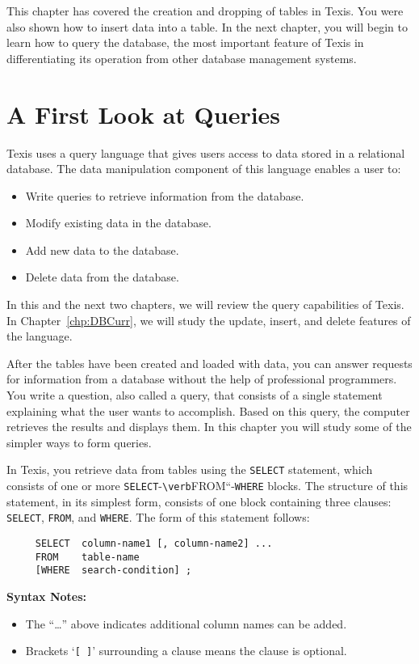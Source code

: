 This chapter has covered the creation and dropping of tables in Texis.
You were also shown how to insert data into a table.  In the next
chapter, you will begin to learn how to query the database, the most
important feature of Texis in differentiating its operation from other
database management systems.

\chapter{A First Look at Queries}{\label{chp:Quer}}

Texis uses a query language that gives users access to data stored in
a relational database.  The data manipulation component of this
language enables a user to:

\begin{itemize}
\item Write queries to retrieve information from the database.
\item Modify existing data in the database.
\item Add new data to the database.
\item Delete data from the database.
\end{itemize}

In this and the next two chapters, we will review the query
capabilities of Texis.  In Chapter~\ref{chp:DBCurr}, we will study the
update, insert, and delete features of the language.

After the tables have been created and loaded with data, you can
answer requests for information from a database without the help of
professional programmers.  You write a question, also called a query,
that consists of a single statement explaining what the user wants to
accomplish.  Based on this query, the computer retrieves the results
and displays them.  In this chapter you will study some of the simpler
ways to form queries.

In Texis, you retrieve data from tables using the \verb`SELECT` statement,
which consists of one or more \verb`SELECT`-\verb`\verb`FROM``-\verb`WHERE` blocks.  The structure
of this statement, in its simplest form, consists of one block
containing three clauses:  \verb`SELECT`, \verb`FROM`, and \verb`WHERE`.  The form of this
statement follows:
\begin{verbatim}
     SELECT  column-name1 [, column-name2] ...
     FROM    table-name
     [WHERE  search-condition] ;
\end{verbatim}
{\bf Syntax Notes:}
\begin{itemize}
\item The ``\ldots'' above indicates additional column names can be
added.
\item Brackets `\verb`[ ]`' surrounding a clause means the clause is
optional.
\end{itemize}

